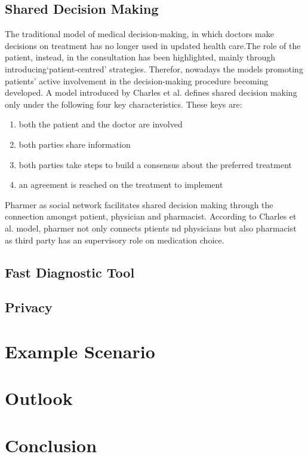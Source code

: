 \documentclass[journal]{IEEEtran}
\begin{document}
\subsection{Shared Decision Making}
\label{subsec: SDM}
The traditional model of medical decision-making, in which doctors make decisions on treatment has no longer used in updated health care.The role of the patient, instead, in the consultation has been highlighted, mainly through introducing‘patient-centred’ strategies. Therefor, nowadays the models promoting patients' active involvement in the decision-making procedure becoming developed.
 A model introduced by Charles et al. defines shared decision making only under the following four key characteristics.
 These keys are:
 \begin{enumerate}
   \item both the patient and the doctor are involved
   \item both parties share information
   \item both parties take steps to build a consensus about the preferred treatment
   \item an agreement is reached on the treatment to implement
 \end{enumerate}

Pharmer as social network facilitates shared decision making through the connection amongst patient, physician and pharmacist. According to Charles et al. model, pharmer not only connects ptients nd physicians but also pharmacist as third party has an supervisory role on medication choice.

\subsection{Fast Diagnostic Tool}

\subsection{Privacy}

\section{Example Scenario}
\label{es}

\section{Outlook}
\label{outlook}

\section{Conclusion}
\label{sec:conclusion}

\begin{spacing}{0.3}
%
%
\end{spacing}

\end{document}
